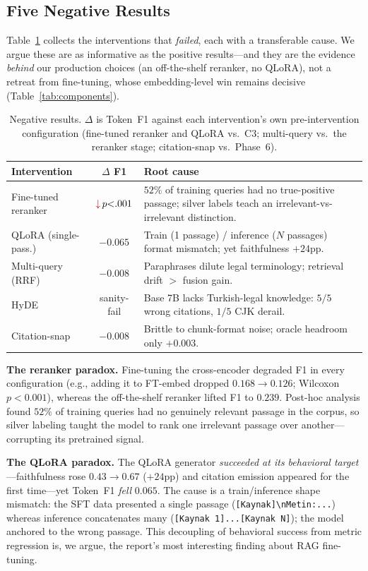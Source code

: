 \documentclass[conference]{IEEEtran}
\newcommand{\bad}{\textcolor{red!70!black}{\ensuremath{\downarrow}}}
\begin{document}
\subsection{Five Negative Results}
Table~\ref{tab:neg} collects the interventions that \emph{failed}, each with a
transferable cause. We argue these are as informative as the positive
results---and they are the evidence \emph{behind} our production choices (an
off-the-shelf reranker, no QLoRA), not a retreat from fine-tuning, whose
embedding-level win remains decisive (Table~\ref{tab:components}).

\begin{table}[t]
\caption{Negative results. $\Delta$ is Token~F1 against each intervention's own
pre-intervention configuration (fine-tuned reranker and QLoRA vs.\ C3;
multi-query vs.\ the reranker stage; citation-snap vs.\ Phase~6).}
\label{tab:neg}
\centering\footnotesize
\begin{tabular}{@{}lcp{3.2cm}@{}}
\toprule
Intervention & $\Delta$ F1 & Root cause \\
\midrule
Fine-tuned reranker & $\bad\,p{<}.001$ & $52\%$ of training queries had no true-positive passage; silver labels teach an irrelevant-vs-irrelevant distinction. \\
QLoRA (single-pass.) & $-0.065$ & Train (1 passage) / inference ($N$ passages) format mismatch; yet faithfulness $+24$pp. \\
Multi-query (RRF) & $-0.008$ & Paraphrases dilute legal terminology; retrieval drift $>$ fusion gain. \\
HyDE & sanity-fail & Base 7B lacks Turkish-legal knowledge: $5/5$ wrong citations, $1/5$ CJK derail. \\
Citation-snap & $-0.008$ & Brittle to chunk-format noise; oracle headroom only $+0.003$. \\
\bottomrule
\end{tabular}
\end{table}

\textbf{The reranker paradox.} Fine-tuning the cross-encoder degraded F1 in
every configuration (e.g., adding it to FT-embed dropped $0.168\rightarrow
0.126$; Wilcoxon $p{<}0.001$), whereas the off-the-shelf reranker lifted F1 to
$0.239$. Post-hoc analysis found $52\%$ of training queries had no genuinely
relevant passage in the corpus, so silver labeling taught the model to rank one
irrelevant passage over another---corrupting its pretrained signal.

\textbf{The QLoRA paradox.} The QLoRA generator \emph{succeeded at its
behavioral target}---faithfulness rose $0.43\rightarrow 0.67$ ($+24$pp) and
citation emission appeared for the first time---yet Token~F1 \emph{fell}
$0.065$. The cause is a train/inference shape mismatch: the SFT data presented a
single passage (\texttt{[Kaynak]\textbackslash nMetin:...}) whereas inference
concatenates many (\texttt{[Kaynak 1]...[Kaynak N]}); the model anchored to the
wrong passage. This decoupling of behavioral success from metric regression is,
we argue, the report's most interesting finding about RAG fine-tuning.
\end{document}
